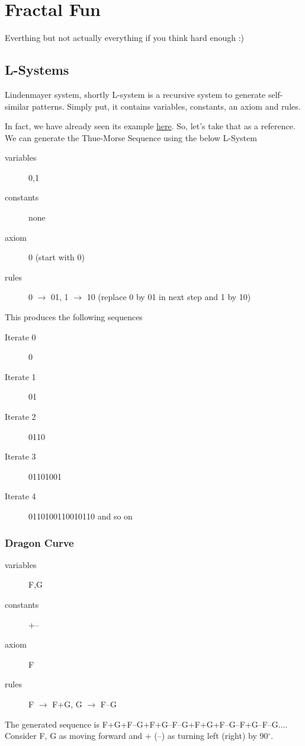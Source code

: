 \recalctypearea
\section{Fractal Fun}
\begin{topics}
Everthing but not actually everything if you think hard enough :)
\end{topics}
\subsection{L-Systems}{\label{pp:lsystems}}
Lindenmayer system, shortly L-system is a recursive system to generate self-similar patterns.
Simply put, it contains variables, constants, an axiom and rules.

In fact, we have already seen its example \hyperref[pp:thuemorsesequence]{here}. So, let's take that as a reference. We can generate the Thue-Morse Sequence using the below L-System
\begin{description}
	\item[variables] 0,1
	\item[constants] none
	\item[axiom] 0 (start with 0)
	\item[rules] 0 $\rightarrow$ 01, 1 $\rightarrow$ 10 (replace 0 by 01 in next step and 1 by 10)
\end{description}
This produces the following sequences
\begin{description}
	\item[Iterate 0] 0
	\item[Iterate 1] 01
	\item[Iterate 2] 0110
	\item[Iterate 3] 01101001
	\item[Iterate 4] 0110100110010110 and so on
\end{description}
\subsubsection{Dragon Curve}{\label{pp:dragoncurve}}
\begin{description}
	\item[variables] F,G
	\item[constants] +--
	\item[axiom] F
	\item[rules] F $\rightarrow$ F+G, G $\rightarrow$ F--G
\end{description}
The generated sequence is F+G+F--G+F+G--F--G+F+G+F--G--F+G--F--G$\ldots$. Consider F, G as moving forward and + (--) as turning left (right) by 90$^\circ$.

